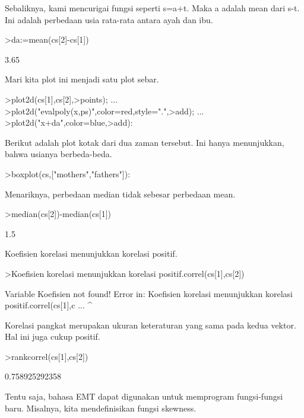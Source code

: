 \documentclass[a4paper,10pt]{article}
\begin{document}
\begin{eulernotebook}
\begin{eulercomment}
\begin{eulercomment}
\begin{eulercomment}
Sebaliknya, kami mencurigai fungsi seperti s=a+t. Maka a adalah mean
dari s-t. Ini adalah perbedaan usia rata-rata antara ayah dan ibu.
\end{eulercomment}
\begin{eulerprompt}
>da:=mean(cs[2]-cs[1])
\end{eulerprompt}
\begin{euleroutput}
  3.65
\end{euleroutput}
\begin{eulercomment}
Mari kita plot ini menjadi satu plot sebar.
\end{eulercomment}
\begin{eulerprompt}
>plot2d(cs[1],cs[2],>points);  ...
>plot2d("evalpoly(x,ps)",color=red,style=".",>add);  ...
>plot2d("x+da",color=blue,>add):
\end{eulerprompt}
\begin{eulercomment}
Berikut adalah plot kotak dari dua zaman tersebut. Ini hanya
menunjukkan, bahwa usianya berbeda-beda.
\end{eulercomment}
\begin{eulerprompt}
>boxplot(cs,["mothers","fathers"]):
\end{eulerprompt}
\begin{eulercomment}
Menariknya, perbedaan median tidak sebesar perbedaan mean.
\end{eulercomment}
\begin{eulerprompt}
>median(cs[2])-median(cs[1])
\end{eulerprompt}
\begin{euleroutput}
  1.5
\end{euleroutput}
\begin{eulercomment}
Koefisien korelasi menunjukkan korelasi positif.
\end{eulercomment}
\begin{eulerprompt}
>Koefisien korelasi menunjukkan korelasi positif.correl(cs[1],cs[2])
\end{eulerprompt}
\begin{euleroutput}
  Variable Koefisien not found!
  Error in:
  Koefisien korelasi menunjukkan korelasi positif.correl(cs[1],c ...
            ^
\end{euleroutput}
\begin{eulercomment}
Korelasi pangkat merupakan ukuran keteraturan yang sama pada kedua
vektor. Hal ini juga cukup positif.
\end{eulercomment}
\begin{eulerprompt}
>rankcorrel(cs[1],cs[2])
\end{eulerprompt}
\begin{euleroutput}
  0.758925292358
\end{euleroutput}
\begin{eulercomment}
Tentu saja, bahasa EMT dapat digunakan untuk memprogram fungsi-fungsi
baru. Misalnya, kita mendefinisikan fungsi skewness.


\end{eulercomment}
\end{eulercomment}
\end{eulercomment}
\end{eulernotebook}
\end{document}
